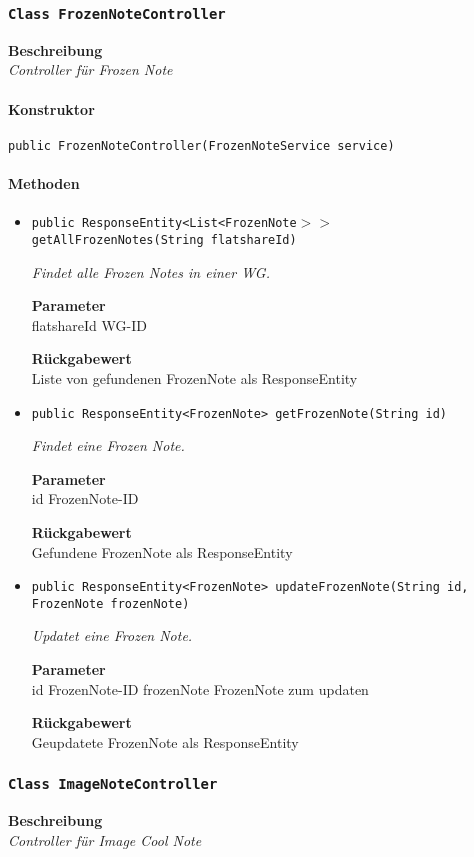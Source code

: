     \subsubsection{\texttt{Class FrozenNoteController}}
    \textbf{Beschreibung} \\
    \textit{Controller für Frozen Note}
    \paragraph*{Konstruktor}
    \texttt{public FrozenNoteController(FrozenNoteService service)}
    \paragraph*{Methoden}
    \begin{itemize}
    	\item{\texttt{public ResponseEntity<List<FrozenNote$>>$ getAllFrozenNotes(String flatshareId)}}
    	
    	\textit{Findet alle Frozen Notes in einer WG.}
    	
    	\textbf{Parameter} \\
    	flatshareId WG-ID
    	
    	\textbf{Rückgabewert} \\
    	Liste von gefundenen FrozenNote als ResponseEntity        \item{\texttt{public ResponseEntity<FrozenNote> getFrozenNote(String id)}}
    	
    	\textit{Findet eine Frozen Note.}
    	
    	\textbf{Parameter} \\
    	id FrozenNote-ID
    	
    	\textbf{Rückgabewert} \\
    	Gefundene FrozenNote als ResponseEntity        \item{\texttt{public ResponseEntity<FrozenNote> updateFrozenNote(String id, FrozenNote frozenNote)}}
    	
    	\textit{Updatet eine Frozen Note.}
    	
    	\textbf{Parameter} \\
    	id FrozenNote-ID
    	frozenNote FrozenNote zum updaten
    	
    	\textbf{Rückgabewert} \\
    	Geupdatete FrozenNote als ResponseEntity
    \end{itemize}
    \subsubsection{\texttt{Class ImageNoteController}}
    \textbf{Beschreibung} \\
    \textit{Controller für Image Cool Note}
